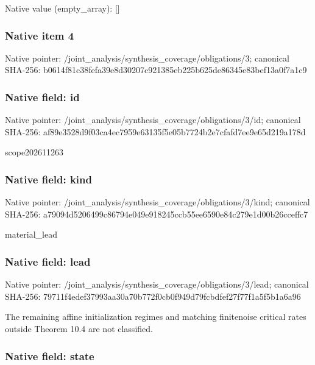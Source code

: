 \documentclass[10pt,a4paper]{article}
\begin{document}
Native value (empty\_array): []



\subsubsection{Native item 4}


Native pointer: /joint\_analysis/synthesi\allowbreak{}s\_coverage/obligations/3; canonical SHA-256: b0614f81c38fefa39e8d3020\allowbreak{}7c921385eb225b625de86345\allowbreak{}e83bef13a0f7a1c9



\subsubsection{Native field: id}


Native pointer: /joint\_analysis/synthesi\allowbreak{}s\_coverage/obligations/3\allowbreak{}/id; canonical SHA-256: af89e3528d9f03ca4ec7959e\allowbreak{}63135f5e05b7724b2e7cfafd\allowbreak{}7ee9e65d219a178d


scope202611263


\subsubsection{Native field: kind}


Native pointer: /joint\_analysis/synthesi\allowbreak{}s\_coverage/obligations/3\allowbreak{}/kind; canonical SHA-256: a79094d5206499c86794e049\allowbreak{}e918245ccb55ee6590e84c27\allowbreak{}9e1d00b26cceffc7


material\_lead


\subsubsection{Native field: lead}


Native pointer: /joint\_analysis/synthesi\allowbreak{}s\_coverage/obligations/3\allowbreak{}/lead; canonical SHA-256: 79711f4edef37993aa30a70b\allowbreak{}772f0cb0f949d79fcbdfef27\allowbreak{}f77f1a5f5b1a6a96


The remaining affine initialization regimes and matching finitenoise critical rates outside Theorem 10.4 are not classified.


\subsubsection{Native field: state}
\end{document}
